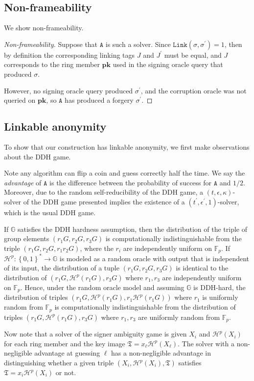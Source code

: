 \documentclass[draft]{llncs} %
\begin{document}
\subsection{Non-frameability}
We show non-frameability.

\begin{proof}[Non-frameability]
Suppose that $\texttt{A}$ is such a solver. Since $\texttt{Link}(\sigma,\sigma^\prime) = 1$, then by definition the corresponding linking tags $J$ and $J^\prime$ must be equal, and $J$ corresponds to the ring member $\textbf{pk}$ used in the signing oracle query that produced $\sigma$.

However, no signing oracle query produced $\sigma^\prime$, and the corruption oracle was not queried on $\textbf{pk}$, so $\texttt{A}$ has produced a forgery $\sigma^\prime$.
\end{proof}


\subsection{Linkable anonymity}
To show that our construction has linkable anonymity, we first make observations about the DDH game.

Note any algorithm can flip a coin and guess correctly half the time. We say the \textit{advantage} of $\texttt{A}$ is the difference between the probability of success for $\texttt{A}$ and $1/2$. Moreover, due to the random self-reducibility of the DDH game, a $(t, \epsilon, \kappa)$-solver of the DDH game presented implies the existence of a $(t^\prime, \epsilon^\prime, 1)$-solver, which is the usual DDH game.

\begin{remark}
If $\mathbb{G}$ satisfies the DDH hardness assumption, then the distribution of the triple of group elements $(r_1G, r_2G, r_3G)$ is computationally indistinguishable from the triple $(r_1G, r_2G, r_1r_2G)$,  where the $r_i$ are independently uniform on $\mathbb{F}_p$. If $\mathcal{H}^p: \left\{0,1\right\}^* \to \mathbb{G}$ is modeled as a random oracle with output that is independent of its input, the distribution of a tuple $(r_1G, r_2G, r_3G)$ is identical to the distribution of $(r_1G, \mathcal{H}^p(r_1G), r_3G)$ where $r_1, r_3$ are independently uniform on $\mathbb{F}_p$. Hence, under the random oracle model and assuming $\mathbb{G}$ is DDH-hard, the distribution of triples $(r_1G, \mathcal{H}^p(r_1G), r_1\mathcal{H}^p(r_1G))$ where $r_1$ is uniformly random from $\mathbb{F}_p$ is computationally indistinguishable from the distribution of triples $(r_1G, \mathcal{H}^p(r_1G), r_3G)$ where $r_1, r_3$ are uniformly random from $\mathbb{F}_p$.

Now note that a solver of the signer ambiguity game is given $X_i$ and $\mathcal{H}^p(X_i)$ for each ring member and the key image $\mathfrak{T} = x_\ell \mathcal{H}^p(X_\ell)$. The solver with a non-negligible advantage at guessing $\ell$ has a non-negligible advantage in distinguishing whether a given triple $(X_i, \mathcal{H}^p(X_i), \mathfrak{T})$ satisfies $\mathfrak{T} = x_i \mathcal{H}^p(X_i)$ or not.
\end{remark}
\end{document}
